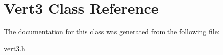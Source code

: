 \hypertarget{class_vert3}{}\section{Vert3 Class Reference}
\label{class_vert3}


The documentation for this class was generated from the following file\+:\begin{DoxyCompactItemize}
\item 
vert3.\+h\end{DoxyCompactItemize}
